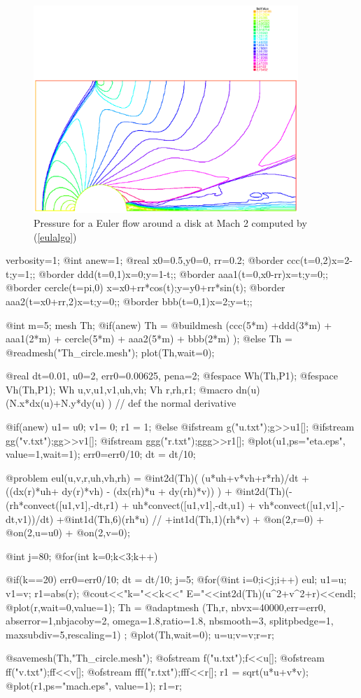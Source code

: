 \documentclass[a4paper,twoside,12pt]{book}
\begin{document}
%
\begin{figure}[htbp]
\begin{center}
\includegraphics[width=10cm]{mach2r}
\caption{ \label{figvfive} Pressure for a Euler flow around a disk at Mach 2 computed by (\ref{eulalgo}) }
\end{center}
\end{figure}
%
\bFF
verbosity=1;
@int anew=1;
@real x0=0.5,y0=0, rr=0.2;
@border ccc(t=0,2){x=2-t;y=1;};
@border ddd(t=0,1){x=0;y=1-t;};
@border aaa1(t=0,x0-rr){x=t;y=0;};
@border cercle(t=pi,0){ x=x0+rr*cos(t);y=y0+rr*sin(t);}
@border aaa2(t=x0+rr,2){x=t;y=0;};
@border bbb(t=0,1){x=2;y=t;};

@int m=5; mesh Th;
@if(anew) Th = @buildmesh (ccc(5*m) +ddd(3*m) + aaa1(2*m) + cercle(5*m)
              + aaa2(5*m) + bbb(2*m) );
      @else Th = @readmesh("Th_circle.mesh"); plot(Th,wait=0);

@real dt=0.01, u0=2, err0=0.00625, pena=2;
@fespace Wh(Th,P1);
@fespace Vh(Th,P1);
Wh u,v,u1,v1,uh,vh;
Vh r,rh,r1;
@macro dn(u) (N.x*dx(u)+N.y*dy(u) ) //  def the normal derivative

@if(anew){ u1= u0; v1= 0; r1 = 1;}
@else {
    @ifstream g("u.txt");g>>u1[];
    @ifstream gg("v.txt");gg>>v1[];
    @ifstream ggg("r.txt");ggg>>r1[];
    @plot(u1,ps="eta.eps", value=1,wait=1);
    err0=err0/10; dt = dt/10;
}

@problem  eul(u,v,r,uh,vh,rh)
   = @int2d(Th)(  (u*uh+v*vh+r*rh)/dt
                  + ((dx(r)*uh+ dy(r)*vh) - (dx(rh)*u + dy(rh)*v))
               )
 + @int2d(Th)(-(rh*convect([u1,v1],-dt,r1) + uh*convect([u1,v1],-dt,u1)
                + vh*convect([u1,v1],-dt,v1))/dt)
  +@int1d(Th,6)(rh*u)   // +int1d(Th,1)(rh*v)
 + @on(2,r=0) + @on(2,u=u0) + @on(2,v=0);

@int j=80;
@for(int k=0;k<3;k++)
{
    @if(k==20){ err0=err0/10; dt = dt/10; j=5;}
    @for(@int i=0;i<j;i++){
       eul; u1=u; v1=v; r1=abs(r);
        @cout<<"k="<<k<<"  E="<<int2d(Th)(u^2+v^2+r)<<endl;
        @plot(r,wait=0,value=1);
}
Th = @adaptmesh (Th,r, nbvx=40000,err=err0,
      abserror=1,nbjacoby=2, omega=1.8,ratio=1.8, nbsmooth=3,
      splitpbedge=1, maxsubdiv=5,rescaling=1) ;
 @plot(Th,wait=0);
 u=u;v=v;r=r;

@savemesh(Th,"Th_circle.mesh");
@ofstream f("u.txt");f<<u[];
@ofstream ff("v.txt");ff<<v[];
@ofstream fff("r.txt");fff<<r[];
r1 = sqrt(u*u+v*v);
@plot(r1,ps="mach.eps", value=1);
r1=r;
}
\eFF
\end{document}
